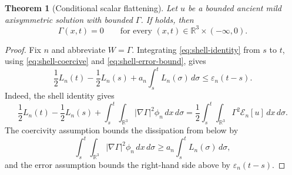 \documentclass[11pt]{amsart}
\theoremstyle{plain}
\newtheorem{theorem}{Theorem}[section]
\theoremstyle{definition}
\theoremstyle{remark}
\numberwithin{equation}{section}
\begin{document}
\begin{theorem}[Conditional scalar flattening]\label{thm:scalar-flattening}
Let \(u\) be a bounded ancient mild axisymmetric solution with bounded
\(\Gamma\).  If  holds, then
\[
   \Gamma(x,t)=0
   \qquad\text{for every }(x,t)\in\mathbb R^3\times(-\infty,0).
\]
\end{theorem}

\begin{proof}
Fix \(n\) and abbreviate \(W=\Gamma\).  Integrating
\eqref{eq:shell-identity} from \(s\) to \(t\), using
\eqref{eq:shell-coercive} and \eqref{eq:shell-error-bound}, gives
\[
   \frac12L_n(t)-\frac12L_n(s)
   +
   a_n\int_s^tL_n(\sigma)\,d\sigma
   \le
   \varepsilon_n(t-s).
\]
Indeed, the shell identity gives
\[
   \frac12 L_n(t)-\frac12L_n(s)
   +
   \int_s^t\int_{\mathbb R^3}|\nabla\Gamma|^2\phi_n\,dx\,d\sigma
   =
   \frac12\int_s^t\int_{\mathbb R^3}\Gamma^2\mathcal E_n[u]\,dx\,d\sigma .
\]
The coercivity assumption bounds the dissipation from below by
\[
   \int_s^t\int_{\mathbb R^3}|\nabla\Gamma|^2\phi_n\,dx\,d\sigma
   \ge
   a_n\int_s^tL_n(\sigma)\,d\sigma,
\]
and the error assumption bounds the right-hand side above by
\(\varepsilon_n(t-s)\).


\end{proof}
\end{document}
